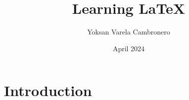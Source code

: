 \documentclass{article}
\title{Learning LaTeX}
\author{Yoksan Varela Cambronero}
\date{April 2024}
\begin{document}
\maketitle

\section{Introduction}
\end{document}
